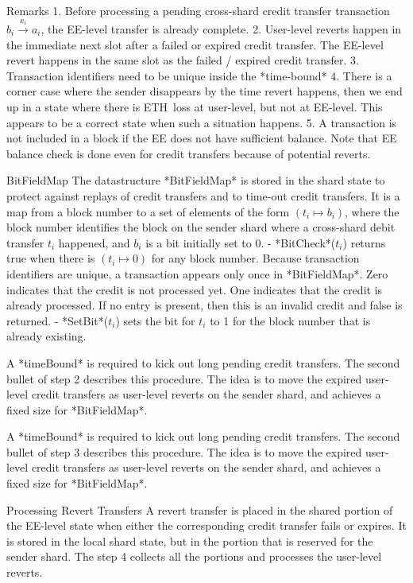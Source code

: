 \documentclass{article}
\newcommand{\eth}[0]{ETH~}
\begin{document}
Remarks
1. Before processing a pending cross-shard credit transfer transaction $b_i \stackrel{x_i}{\longrightarrow} a_i$, the EE-level transfer is already complete. 
2. User-level reverts happen in the immediate next slot after a failed or expired credit transfer. The EE-level revert happens in the same slot as the failed / expired credit transfer.
3. Transaction identifiers need to be unique inside the *time-bound*
4. There is a corner case where the sender disappears by the time revert happens, then we end up in a state where there is \eth loss at user-level, but not at EE-level. This appears to be a correct state when such a  situation happens.
5. A transaction is not included in a block if the EE does not have sufficient balance. Note that EE balance check is done even for credit transfers because of potential reverts.

BitFieldMap
The datastructure *BitFieldMap* is stored in the shard state to protect against replays of credit transfers and to time-out credit transfers. It is a map from a block number to a set of elements of the form $(t_i \mapsto b_i)$, where the block number identifies the block on the sender shard where a cross-shard debit transfer $t_i$ happened, and $b_i$ is a bit initially set to 0.  
- *BitCheck*($t_i$) returns true when there is $(t_i \mapsto 0)$ for any block number. Because transaction identifiers are unique, a transaction appears only once in *BitFieldMap*. Zero indicates that the credit is not processed yet. One indicates that the credit is already processed. If no entry is present, then this is an invalid credit and false is returned.
- *SetBit*($t_i$) sets the bit for $t_i$ to 1 for the block number that is already existing. 

A *timeBound* is required to kick out long pending credit transfers. The second bullet of step 2 describes this procedure. The idea is to move the expired user-level credit transfers as user-level reverts on the sender shard, and achieves a fixed size for *BitFieldMap*.

A *timeBound* is required to kick out long pending credit transfers. The second bullet of step 3 describes this procedure. The idea is to move the expired user-level credit transfers as user-level reverts on the sender shard, and achieves a fixed size for *BitFieldMap*.

Processing Revert Transfers
A revert transfer is placed in the shared portion of the EE-level state when either the corresponding credit transfer fails or expires. It is stored in the local shard state, but in the portion that is reserved for the sender shard. The step 4 collects all the portions and processes the user-level reverts. 
\end{document}
